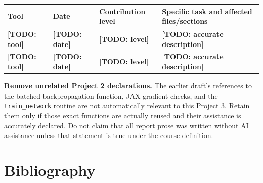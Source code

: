 \documentclass[11pt,a4paper]{article}
\newcommand{\todo}[1]{\textcolor{red!75!black}{\textbf{[TODO: #1]}}}
\begin{document}
\begin{center}
\begin{tabularx}{\textwidth}{P{2.2cm}P{2.0cm}P{2.2cm}X}
\toprule
\textbf{Tool} & \textbf{Date} & \textbf{Contribution level} & \textbf{Specific task and affected files/sections}\\
\midrule
\todo{tool} & \todo{date} & \todo{level} & \todo{accurate description}\\
\todo{tool} & \todo{date} & \todo{level} & \todo{accurate description}\\
\bottomrule
\end{tabularx}
\end{center}

\textbf{Remove unrelated Project 2 declarations.} The earlier draft's references to the batched-backpropagation function, JAX gradient checks, and the \texttt{train\_network} routine are not automatically relevant to this Project 3. Retain them only if those exact functions are actually reused and their assistance is accurately declared. Do not claim that all report prose was written without AI assistance unless that statement is true under the course definition.

\section{Bibliography}
\label{sec:bibliography}
\end{document}
